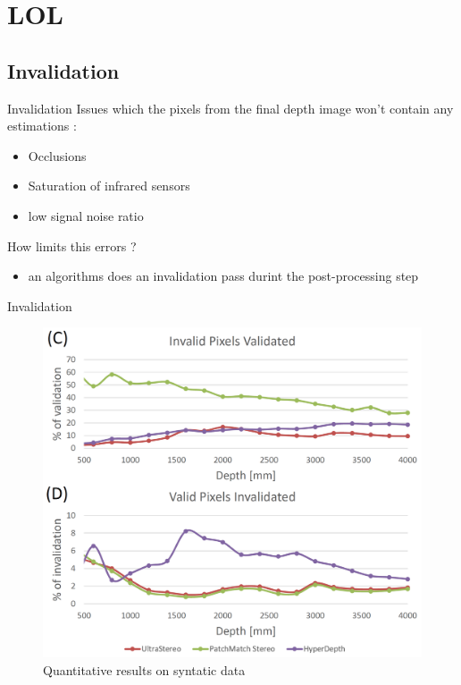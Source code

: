 %
%
\section{LOL}%
\subsection{Invalidation}
\begin{frame}{Invalidation}
Issues which the pixels from the final depth image won't contain any estimations :
\begin{itemize}
\item Occlusions
\item Saturation of infrared sensors
\item low signal noise ratio
\end{itemize}
How limits this errors ?
\begin{itemize}
\item an algorithms does an invalidation pass durint the post-processing step
\end{itemize}
\end{frame}

\begin{frame}{Invalidation}
\begin{figure}
\includegraphics[scale=0.25]{pictures/invalidation}
\caption{Quantitative results on syntatic data}
\end{figure}
\end{frame}


